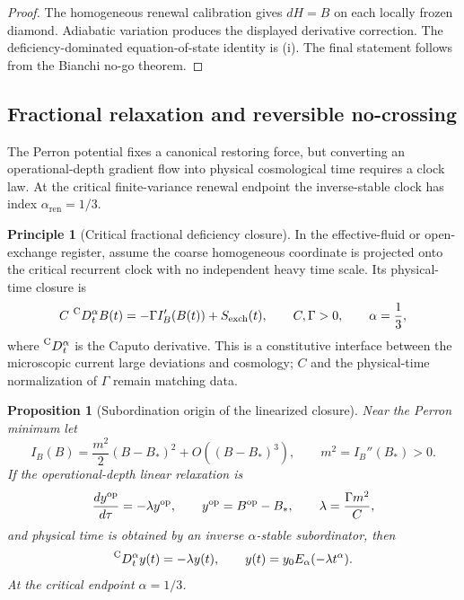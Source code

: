 \documentclass[11pt]{article}
\newtheorem{proposition}[theorem]{Proposition}
\theoremstyle{definition}
\newtheorem{principle}[theorem]{Principle}
\theoremstyle{remark}
\newcommand{\ren}{\mathrm{ren}}
\begin{document}
\begin{proof}
The homogeneous renewal calibration gives \(dH=B\) on each locally frozen
diamond.  Adiabatic variation produces the displayed derivative correction.
The deficiency-dominated equation-of-state identity is
(i).  The final statement follows from the
Bianchi no-go theorem.
\end{proof}

\subsection{Fractional relaxation and reversible no-crossing}
\label{subsec:fractional-deficiency-relaxation}

The Perron potential fixes a canonical restoring force, but converting an
operational-depth gradient flow into physical cosmological time requires a clock
law.  At the critical finite-variance renewal endpoint the inverse-stable clock
has index \(\alpha_{\ren}=1/3\).

\begin{principle}[Critical fractional deficiency closure]
\label{prin:critical-deficiency-closure}
In the effective-fluid or open-exchange register, assume the coarse homogeneous
coordinate is projected onto the critical recurrent clock with no independent
heavy time scale.  Its physical-time closure is
\[
  C\,\prescript{\mathrm C}{}{D}_t^{\alpha}B(t)
  =-\Gamma I_B'(B(t))+S_{\rm exch}(t),
  \qquad C,\Gamma>0,
  \qquad \alpha=\frac13,
\]
where \(\prescript{\mathrm C}{}{D}_t^{\alpha}\) is the Caputo derivative.
This is a constitutive interface between the microscopic current large
deviations and cosmology; \(C\) and the physical-time normalization of
\(\Gamma\) remain matching data.
\end{principle}

\begin{proposition}[Subordination origin of the linearized closure]
\label{prop:deficiency-subordination}
Near the Perron minimum let
\[
 I_B(B)=\frac{m^2}{2}(B-B_*)^2+O((B-B_*)^3),
 \qquad m^2=I_B''(B_*)>0.
\]
If the operational-depth linear relaxation is
\[
  \frac{dy^{\rm op}}{d\tau}=-\lambda y^{\rm op},
  \qquad y^{\rm op}=B^{\rm op}-B_*,
  \qquad \lambda=\frac{\Gamma m^2}{C},
\]
and physical time is obtained by an inverse \(\alpha\)-stable subordinator, then
\[
  \prescript{\mathrm C}{}{D}_t^{\alpha}y(t)=-\lambda y(t),
  \qquad
  y(t)=y_0E_\alpha(-\lambda t^\alpha).
\]
At the critical endpoint \(\alpha=1/3\).
\end{proposition}
\end{document}
